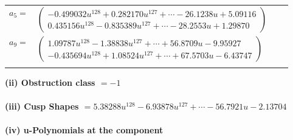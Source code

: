 \documentclass[1p]{elsarticle_modified}
\theoremstyle{definition}
\begin{document}
\begin{tabular}{m{7pt} m{180pt} m{7pt} m{180pt} }
\flushright $a_{5}=$&$\begin{pmatrix}-0.499032 u^{128}+0.282170 u^{127}+\cdots-26.1238 u+5.09116\\0.435156 u^{128}-0.835389 u^{127}+\cdots-28.2553 u+1.29870\end{pmatrix}$ \\
\flushright $a_{9}=$&$\begin{pmatrix}1.09787 u^{128}-1.38838 u^{127}+\cdots+56.8709 u-9.95927\\-0.435694 u^{128}+1.08524 u^{127}+\cdots+67.5703 u-6.43747\end{pmatrix}$\\&\end{tabular}
\flushleft \textbf{(ii) Obstruction class $= -1$}\\~\\
\flushleft \textbf{(iii) Cusp Shapes $= 5.38288 u^{128}-6.93878 u^{127}+\cdots-56.7921 u-2.13704$}\\~\\
\newpage\renewcommand{\arraystretch}{1}
\flushleft \textbf{(iv) u-Polynomials at the component}\newline \\
\end{document}
